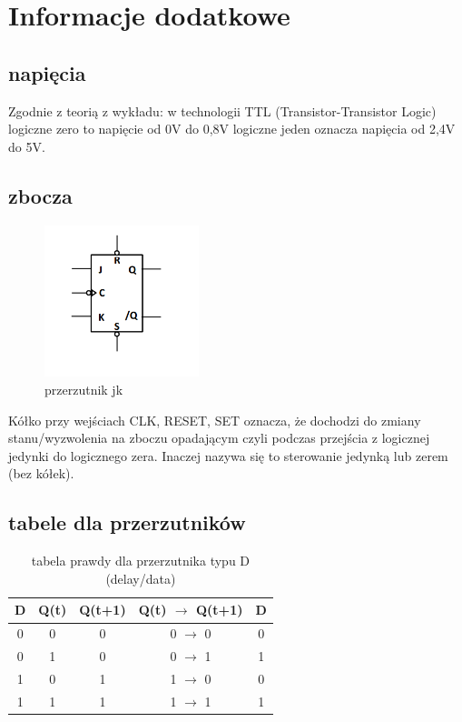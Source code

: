 \section{Informacje dodatkowe}

\subsection{napięcia}

Zgodnie z teorią z wykładu: w technologii TTL (Transistor-Transistor Logic)\newline
logiczne zero to napięcie od 0V do 0,8V \newline
logiczne jeden oznacza napięcia od 2,4V do 5V.

\subsection{zbocza}

\begin{figure}[h]
    \centering
    \includegraphics[width=0.4\textwidth]{images/other/jk.png}
    \caption{przerzutnik jk}
    \label{fig:my_label}
\end{figure}

Kółko przy wejściach CLK, RESET, SET oznacza, że dochodzi do zmiany stanu/wyzwolenia na zboczu opadającym czyli podczas przejścia z logicznej jedynki do logicznego zera. Inaczej nazywa się to sterowanie jedynką lub zerem (bez kółek).

\subsection{tabele dla przerzutników}

\begin{table}[h!]
    \centering
    \begin{tabular}{c|c|c||c|c}
        D & Q(t) & Q(t+1) & Q(t) $\rightarrow$ Q(t+1) & D \\
        \hline
        0 & 0 & 0 & 0 $\rightarrow$ 0 & 0 \\
        0 & 1 & 0 & 0 $\rightarrow$ 1 & 1 \\
        1 & 0 & 1 & 1 $\rightarrow$ 0 & 0 \\
        1 & 1 & 1 & 1 $\rightarrow$ 1 & 1 \\
    \end{tabular}
    \caption{tabela prawdy dla przerzutnika typu D (delay/data)}
    \label{tab:my_label}
\end{table}

